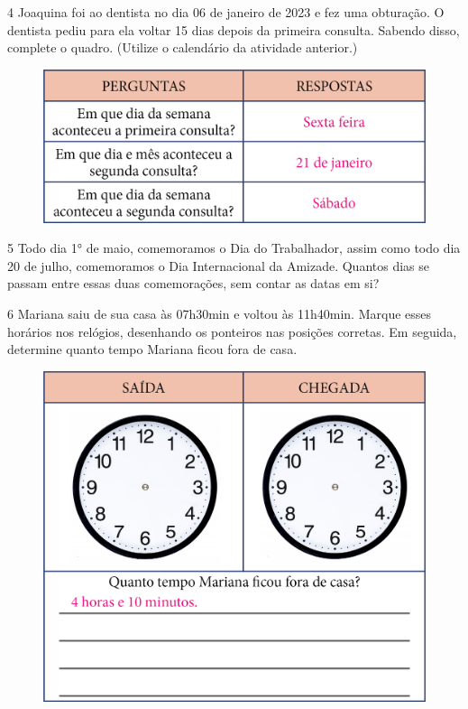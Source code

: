 \num{4} Joaquina foi ao dentista no dia 06 de janeiro de 2023 e fez uma
obturação. O dentista pediu para ela voltar 15 dias depois da primeira
consulta. Sabendo disso, complete o quadro. (Utilize o calendário
da atividade anterior.)

\begin{figure}[htpb!]
\includegraphics[width=\textwidth]{./media/image53.png}
\end{figure}

\pagebreak
\num{5} Todo dia 1° de maio, comemoramos o Dia do Trabalhador,
assim como todo dia 20 de julho, comemoramos o
Dia Internacional da Amizade. Quantos dias se passam entre essas duas
comemorações, sem contar as datas em si?


\num{6} Mariana saiu de sua casa às 07h30min e voltou às 11h40min. Marque esses
horários nos relógios, desenhando os ponteiros nas posições
corretas. Em seguida, determine quanto tempo Mariana ficou fora de casa.


\begin{figure}[htpb!]
\centering
\includegraphics[width=.65\textwidth]{./media/image54.png}
\end{figure}

